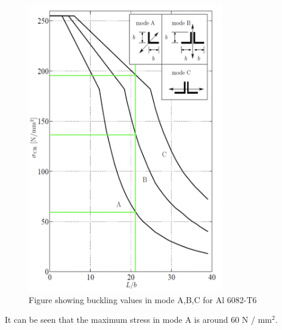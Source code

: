 \documentclass[12pt]{article}
\begin{document}
                    \begin{figure}[H]
                        \begin{center}
                        \captionsetup{labelfont=bf}
                        \captionsetup{justification=centering}
                        \includegraphics[height=30pc]{buckling.png}
                        \caption{Figure showing buckling values in mode A,B,C for Al 6082-T6}
                        \end{center}
                    \end{figure}
                    It can be seen that the maximum stress in mode A is around 60 N / mm$^2$.
\end{document}
